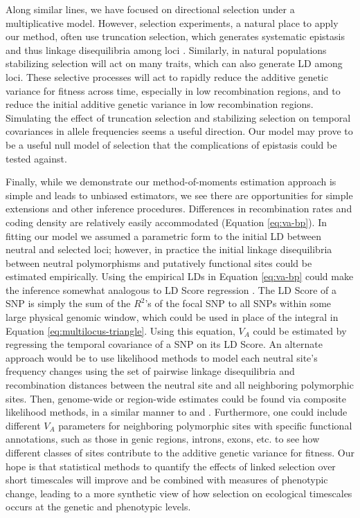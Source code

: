 \documentclass[11pt]{article}
\begin{document}
Along similar lines, we have focused on directional selection under a
multiplicative model. However, selection experiments, a natural place to apply
our method, often use truncation selection, which generates systematic
epistasis and thus linkage disequilibria among loci
\parencite{Burger2000-an,Walsh2018-bt}. Similarly, in natural populations
stabilizing selection will act on many traits, which can also generate LD among
loci. These selective processes will act to rapidly reduce the additive genetic
variance for fitness across time, especially in low recombination regions, and
to reduce the initial additive genetic variance in low recombination regions.
Simulating the effect of truncation selection and stabilizing selection on
temporal covariances in allele frequencies seems a useful direction. Our model
may prove to be a useful null model of selection that the complications of
epistasis could be tested against. 

Finally, while we demonstrate our method-of-moments estimation approach is
simple and leads to unbiased estimators, we see there are opportunities for
simple extensions and other inference procedures. Differences in recombination
rates and coding density are relatively easily accommodated (Equation
\ref{eq:va-bp}). In fitting our model we assumed a parametric form to the
initial LD between neutral and selected loci; however, in practice the initial
linkage disequilibria between neutral polymorphisms and putatively functional
sites could be estimated empirically. Using the empirical LDs in Equation
\eqref{eq:va-bp} could make the inference somewhat analogous to LD Score
regression \parencite{Bulik-Sullivan2015-ls}. The LD Score of a SNP is simply
the sum of the $R^2$'s of the focal SNP to all SNPs within some large physical
genomic window, which could be used in place of the integral in Equation
\eqref{eq:multilocus-triangle}. Using this equation, $V_A$ could be estimated
by regressing the temporal covariance of a SNP on its LD Score. An alternate
approach would be to use likelihood methods to model each neutral site's
frequency changes using the set of pairwise linkage disequilibria and
recombination distances between the neutral site and all neighboring
polymorphic sites. Then, genome-wide or region-wide estimates could be found
via composite likelihood methods, in a similar manner to
\textcite{McVicker2009-ax} and \textcite{Elyashiv2016-vt}. Furthermore, one
could include different $V_A$ parameters for neighboring polymorphic sites with
specific functional annotations, such as those in genic regions, introns, exons,
etc. to see how different classes of sites contribute to the additive genetic
variance for fitness. Our hope is that statistical methods to quantify the
effects of linked selection over short timescales will improve and be combined
with measures of phenotypic change, leading to a more synthetic view of how
selection on ecological timescales occurs at the genetic and phenotypic levels.
\end{document}
